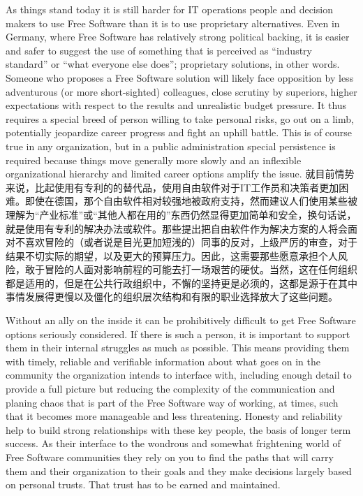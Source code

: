 As things stand today it is still harder for IT operations people and decision
makers to use Free Software than it is to use proprietary alternatives. Even in
Germany, where Free Software has relatively strong political backing, it is
easier and safer to suggest the use of something that is perceived as ``industry
standard'' or ``what everyone else does''; proprietary solutions, in other words.
Someone who proposes a Free Software solution will likely face opposition by
less adventurous (or more short-sighted) colleagues, close scrutiny by
superiors, higher expectations with respect to the results and unrealistic
budget pressure. It thus requires a special breed of person willing to take
personal risks, go out on a limb, potentially jeopardize career progress and
fight an uphill battle. This is of course true in any organization, but in a
public administration special persistence is required because things move
generally more slowly and an inflexible organizational hierarchy and limited
career options amplify the issue.
就目前情势来说，比起使用有专利的的替代品，使用自由软件对于IT工作员和决策者更加困难。即使在德国，那个自由软件相对较强地被政府支持，然而建议人们使用某些被理解为“产业标准”或“其他人都在用的”东西仍然显得更加简单和安全，换句话说，就是使用有专利的解决办法或软件。那些提出把自由软件作为解决方案的人将会面对不喜欢冒险的（或者说是目光更加短浅的）同事的反对，上级严厉的审查，对于结果不切实际的期望，以及更大的预算压力。因此，这需要那些愿意承担个人风险，敢于冒险的人面对影响前程的可能去打一场艰苦的硬仗。当然，这在任何组织都是适用的，但是在公共行政组织中，不懈的坚持更是必须的，这都是源于在其中事情发展得更慢以及僵化的组织层次结构和有限的职业选择放大了这些问题。

Without an ally on the inside it can be prohibitively difficult to get
Free Software options seriously considered. If there is such a person, it is important
to support them in their internal struggles as much as possible. This
means providing them with timely, reliable and verifiable information about
what goes on in the community the organization intends to interface with,
including enough detail to provide a full picture but reducing the
complexity of the communication and planing chaos that is part of the Free
Software way of working, at times, such that it becomes more manageable and
less threatening. Honesty and reliability help to build strong
relationships with these key people, the basis of longer term success. As
their interface to the wondrous and somewhat frightening world of Free
Software communities they rely on you to find the paths that will carry
them and their organization to their goals and they make decisions largely
based on personal trusts. That trust has to be earned and maintained.


